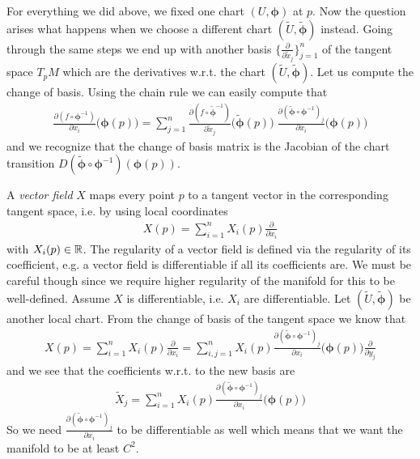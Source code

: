 \documentclass[../master_thesis.tex]{subfiles}
\begin{document}
For everything we did above, we fixed one chart $(U,\boldsymbol{\phi})$ at $p$.
Now the question arises what happens when we choose a different chart 
$(\tilde{U}, \tilde{\boldsymbol{\phi}})$ instead.
Going through the same steps we end up with another basis 
$\{ \frac{\partial}{\partial \tilde{x}_j} \}_{j=1}^n$ of the tangent space $T_p M$
which are the derivatives w.r.t. the chart 
$(\tilde{U}, \tilde{\boldsymbol{\phi}})$. 
Let us compute the change of basis.
Using the chain rule 
we can easily compute that 
\begin{align*}
    \frac{\partial (f \circ \boldsymbol{\phi}^{-1})}{\partial x_i} \big(\boldsymbol{\phi}(p)\big)
    =\sum_{j=1}^n \frac{\partial (f \circ \tilde{\boldsymbol{\phi}}^{-1})}{\partial \tilde{x}_j} 
        \big(\tilde{\boldsymbol{\phi}}(p) \big) \;
        \frac{\partial (\tilde{\boldsymbol{\phi}} \circ \boldsymbol{\phi}^{-1})_j}{\partial x_i}
        \big(\boldsymbol{\phi}(p)\big) 
\end{align*}
and we recognize that the change of basis matrix is the Jacobian of 
the chart transition $D(\tilde{\bm{\phi}} \circ \boldsymbol{\phi}^{-1})(\boldsymbol{\phi}(p))$.

A \textit{vector field} $X$ maps every point $p$ to a tangent vector 
in the corresponding tangent space, i.e. by using local coordinates
\begin{align*}
    X(p) = \sum_{i=1}^n X_i(p) \frac{\partial}{\partial x_i}
\end{align*}
with $X_i(p) \in \mathbb{R}$. The regularity of a vector field is defined via the
regularity of its coefficient, e.g. a vector field is differentiable if 
all its coefficients are. We must be careful though since we require higher 
regularity of the manifold for this to be well-defined. 
Assume $X$ is differentiable, i.e. $X_i$ are differentiable. 
Let $(\tilde{U}, \tilde{\bm{\phi}})$ 
be another local chart.
From the 
change of basis of the tangent space we know that 
\begin{align*}
    X(p) = \sum_{i=1}^n X_i(p) \frac{\partial}{\partial x_i}
    = \sum_{i,j=1}^n X_i(p) \frac{\partial (\tilde{\boldsymbol{\phi}} 
        \circ \boldsymbol{\phi}^{-1})_j}{\partial x_i}\big(\boldsymbol{\phi}(p)\big)
        \frac{\partial}{\partial y_j}
\end{align*}
and we see that the coefficients w.r.t. to the new basis are 
\begin{align*}
    \tilde{X}_j = \sum_{i=1}^n X_i(p) \frac{\partial (\tilde{\boldsymbol{\phi}} 
    \circ \boldsymbol{\phi}^{-1})_j}{\partial x_i}\big(\boldsymbol{\phi}(p)\big)        
\end{align*}
So we need $\frac{\partial (\tilde{\boldsymbol{\phi}} \circ \boldsymbol{\phi}^{-1})_j}{\partial x_i}$ to be 
differentiable as well which means that we want the manifold to be at least $C^2$.
\end{document}
